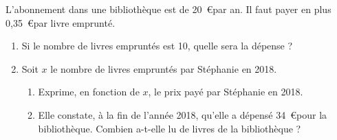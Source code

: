 \begin{minipage}{0.99\linewidth}
\exo

L'abonnement dans une bibliothèque est de 20~\euro par an.
Il faut payer en plus 0,35~\euro par livre emprunté.

\begin{enumerate}
\item Si le nombre de livres empruntés est 10, quelle sera la dépense ?
\item Soit $x$ le nombre de livres empruntés par Stéphanie en 2018.
\begin{enumerate}
\item Exprime, en fonction de $x$, le prix payé par Stéphanie en 2018.
\item Elle constate, à la fin de l'année 2018, qu'elle a dépensé
34~\euro pour la bibliothèque. Combien a-t-elle lu de livres de la bibliothèque ?
\end{enumerate}
\end{enumerate}

\end{minipage}

\vspace{0.5cm}
